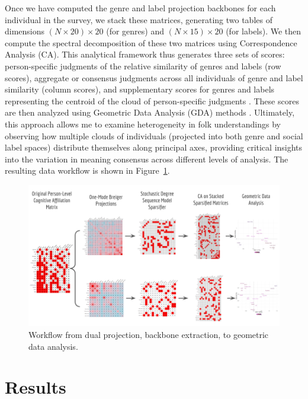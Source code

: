 \documentclass[12pt]{article}
\begin{document}
Once we have computed the genre and label projection backbones for each individual in the survey, we stack these matrices, generating two tables of dimensions $(N \times 20) \times 20$ (for genres) and $(N \times 15) \times 20$ (for labels). We then compute the spectral decomposition of these two matrices using Correspondence Analysis (CA). This analytical framework thus generates three sets of scores: person-specific judgments of the relative similarity of genres and labels (row scores), aggregate or consensus judgments across all individuals of genre and label similarity (column scores), and supplementary scores for genres and labels representing the centroid of the cloud of person-specific judgments \citep{kumbasar1994systematic-213}. These scores are then analyzed using Geometric Data Analysis (GDA) methods \citep{rouanet2000geometric-a44}. Ultimately, this approach allows me to examine heterogeneity in folk understandings by observing how multiple clouds of individuals (projected into both genre and social label spaces) distribute themselves along principal axes, providing critical insights into the variation in meaning consensus across different levels of analysis. The resulting data workflow is shown in Figure~\ref{fig:workflow}.

\begin{figure}[t]
    \captionsetup[subfigure]{font=footnotesize,labelfont=footnotesize}
    \centering
        \includegraphics[trim={0cm 0cm 0cm 0cm},clip, width=1.0\textwidth]{Plots/mondo-workflow.png}
    \caption{Workflow from dual projection, backbone extraction, to geometric data analysis.}
    \label{fig:workflow}
\end{figure}

\section*{Results}
\end{document}
